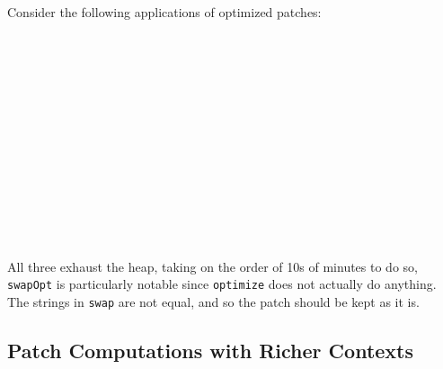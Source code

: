 Consider the following applications of optimized patches:
\begin{code}%
%
\>[2]\AgdaSpace{}%
\AgdaSpace{}%
\AgdaSpace{}%
\AgdaSymbol{:}\AgdaSpace{}%
\<%
\\
%
\>[2]\AgdaSpace{}%
\AgdaSymbol{=}\AgdaSpace{}%
\AgdaSpace{}%
\AgdaSymbol{(}\AgdaSpace{}%
\AgdaSymbol{)}\<%
\\
%
\>[2]\AgdaSpace{}%
\AgdaSymbol{=}\AgdaSpace{}%
\AgdaSpace{}%
\AgdaSymbol{(}\AgdaSpace{}%
\AgdaSymbol{)}\<%
\\
%
\>[2]\AgdaSpace{}%
\AgdaSymbol{=}\AgdaSpace{}%
\AgdaSpace{}%
\AgdaSymbol{(}\AgdaSpace{}%
\AgdaSymbol{)}\<%
\\
%
\\[\AgdaEmptyExtraSkip]%
%
\>[2]\<%
\\
%
\>[2]\<%
\\
%
\\[\AgdaEmptyExtraSkip]%
%
\>[2]\<%
\\
%
\>[2]\<%
\\
%
\\[\AgdaEmptyExtraSkip]%
%
\>[2]\<%
\\
%
\>[2]\<%
\end{code}
All three exhaust the heap, taking on the order of 10s of minutes to do so, \texttt{swapOpt} is
particularly notable since \texttt{optimize} does not actually do anything.
The strings in \texttt{swap} are not equal, and so the patch should be kept as it is.

\subsection{Patch Computations with Richer Contexts}

